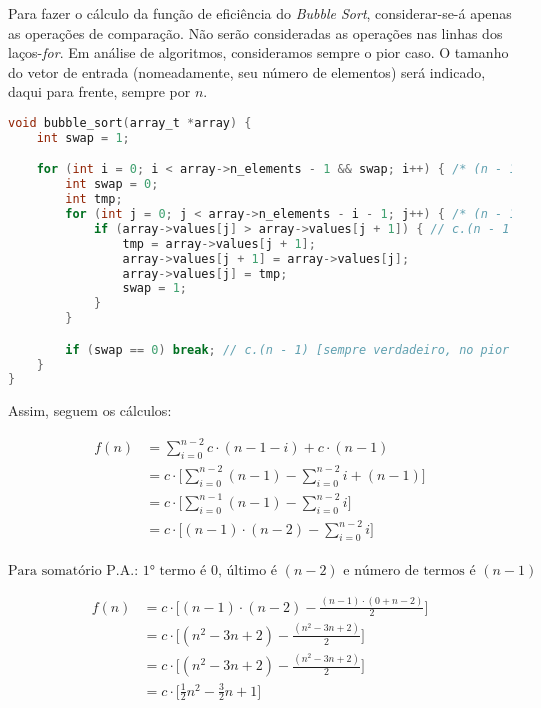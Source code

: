 \documentclass[fontsize=10pt]{article}
\begin{document}
Para fazer o cálculo da função de eficiência do \textit{Bubble Sort}, considerar-se-á apenas as operações de comparação. Não serão consideradas as operações nas linhas dos laços-\textit{for}. Em análise de algoritmos, consideramos sempre o pior caso. O tamanho do vetor de entrada (nomeadamente, seu número de elementos) será indicado, daqui para frente, sempre por $n$.\\

\begin{lstlisting}[language=C]
void bubble_sort(array_t *array) {
    int swap = 1;

    for (int i = 0; i < array->n_elements - 1 && swap; i++) { /* (n - 1) */
        int swap = 0;
        int tmp;
        for (int j = 0; j < array->n_elements - i - 1; j++) { /* (n - 1 - i), [i de 0 a (n - 2)] */
            if (array->values[j] > array->values[j + 1]) { // c.(n - 1 - i), [i de 0 a (n - 2)]
                tmp = array->values[j + 1]; 
                array->values[j + 1] = array->values[j];
                array->values[j] = tmp;
                swap = 1;
            }
        }

        if (swap == 0) break; // c.(n - 1) [sempre verdadeiro, no pior caso]
    }
}
\end{lstlisting}

Assim, seguem os cálculos:

\begin{equation} \label{eq1}
\begin{split}
f(n) & = \sum_{i = 0}^{n - 2} c \cdot (n - 1 - i) + c \cdot (n - 1) \\
     & = c \cdot \Bigg[\sum_{i = 0}^{n - 2} (n - 1) - \sum_{i = 0}^{n - 2} i + (n - 1) \Bigg] \\
     & = c \cdot \Bigg[\sum_{i = 0}^{n - 1} (n - 1) - \sum_{i = 0}^{n - 2} i \Bigg] \\
     & = c \cdot \Bigg[(n - 1) \cdot (n - 2) - \sum_{i = 0}^{n - 2} i \Bigg] \\
\end{split}
\end{equation}

$$ \text{Para somatório P.A.: 1° termo é $0$, último é $(n - 2)$ e número de termos é $(n - 1)$ }$$


\begin{equation} \label{eq2}
\begin{split}
f(n) & = c \cdot \Bigg[(n - 1) \cdot (n - 2)  - \frac{(n - 1) \cdot (0 + n - 2)}{2} \Bigg] \\
	 & = c \cdot \Bigg[(n^2 - 3n + 2)  - \frac{(n^2 - 3n + 2)}{2} \Bigg] \\
	 & = c \cdot \Bigg[(n^2 - 3n + 2)  - \frac{(n^2 - 3n + 2)}{2} \Bigg] \\
	 & = c \cdot \Bigg[\frac{1}{2} n^2 - \frac{3}{2} n + 1 \Bigg] \\
\end{split}
\end{equation}
\end{document}

